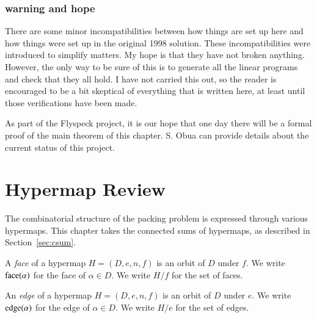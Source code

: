 \subsubsection{warning and hope}

There are some minor incompatibilities between how things are set
up here and how things were set up in the original 1998 solution.
These incompatibilities were introduced to
simplify matters.  My hope is that they have not broken anything.
However, the only way to be sure of this is to generate all the
linear programs and check that they all hold.  I have not carried
this out, so the reader is encouraged to be a bit skeptical of
everything that is written here, at least until those
verifications have been made.

As part of the Flyspeck project, it is our hope that one day there
will be a formal proof of the main theorem of this chapter.  S.
Obua can provide details about the current status of this project.

\section{Hypermap Review}

The combinatorial structure of the packing problem is expressed
through various hypermaps.   This chapter takes
the connected sums of hypermaps, as described in Section~\ref{sec:csum}.

%
%
%

\begin{definition}[face,~$H/f$]  A {\it face} of a hypermap $H=(D,e,n,f)$ is an orbit of $D$
under $f$.  We write ${\operatorname{face}}(\alpha)$ for the face of
$\alpha\in D$.  We write $H/f$ for the set of faces.
\end{definition}

\begin{definition}[edge,~$H/e$]  An {\it edge} of a hypermap $H=(D,e,n,f)$ is an orbit of $D$
under $e$.  We write ${\operatorname{edge}}(\alpha)$ for the edge of
$\alpha\in D$.  We write $H/e$ for the set of edges.
\end{definition}

